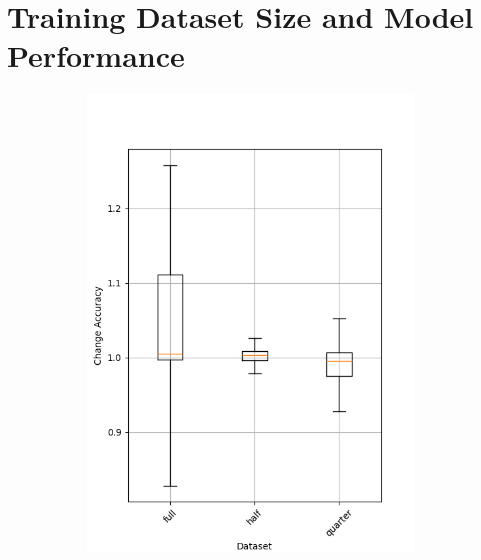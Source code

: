 \section{Training Dataset Size and Model Performance}\label{sec:training-dataset-size-and-model-performance}
\begin{figure}
    \begin{subfigure}{0.5\textwidth}
        \centering
        \includegraphics[width=0.95\textwidth]{plots/Dataset_NotTrained_accuracy.png}
    \end{subfigure}
    \begin{subfigure}{0.5\textwidth}
        \centering

\end{subfigure}
\end{figure}
